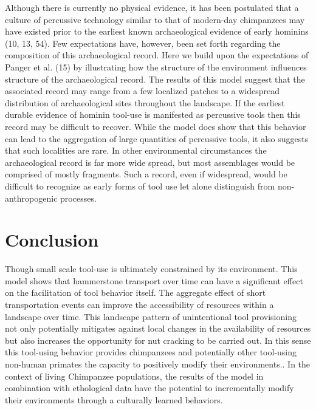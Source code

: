 \documentclass[9pt,twocolumn,twoside,]{pnas-new}
\begin{document}
Although there is currently no physical evidence, it has been postulated
that a culture of percussive technology similar to that of modern-day
chimpanzees may have existed prior to the earliest known archaeological
evidence of early hominins (10, 13, 54). Few expectations have, however,
been set forth regarding the composition of this archaeological record.
Here we build upon the expectations of Panger et al. (15) by
illustrating how the structure of the environment influences structure
of the archaeological record. The results of this model suggest that the
associated record may range from a few localized patches to a widespread
distribution of archaeological sites throughout the landscape. If the
earliest durable evidence of hominin tool-use is manifested as
percussive tools then this record may be difficult to recover. While the
model does show that this behavior can lead to the aggregation of large
quantities of percussive tools, it also suggests that such localities
are rare. In other environmental circumstances the archaeological record
is far more wide spread, but most assemblages would be comprised of
mostly fragments. Such a record, even if widespread, would be difficult
to recognize as early forms of tool use let alone distinguish from
non-anthropogenic processes.

\hypertarget{conclusion}{%
\section{Conclusion}\label{conclusion}}

Though small scale tool-use is ultimately constrained by its
environment. This model shows that hammerstone transport over time can
have a significant effect on the facilitation of tool behavior itself.
The aggregate effect of short transportation events can improve the
accessibility of resources within a landscape over time. This landscape
pattern of unintentional tool provisioning not only potentially
mitigates against local changes in the availability of resources but
also increases the opportunity for nut cracking to be carried out. In
this sense this tool-using behavior provides chimpanzees and potentially
other tool-using non-human primates the capacity to positively modify
their environments.. In the context of living Chimpanzee populations,
the results of the model in combination with ethological data have the
potential to incrementally modify their environments through a
culturally learned behaviors.

\showmatmethods
\showacknow
\pnasbreak
\end{document}
